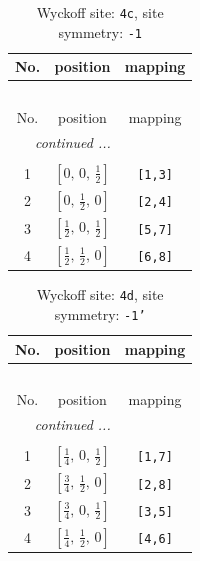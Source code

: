 \documentclass[fleqn,8pt]{jsarticle}
\begin{document}
\renewcommand{\arraystretch}{1.2}
\begin{longtable}{ccc}
\caption{Wyckoff site: {\tt 4c}, site symmetry: {\tt -1}}
 \\
 \hline \hline
No. & position & mapping \\ \hline \endfirsthead

\multicolumn{2}{l}{\tablename\ \thetable{}} \\
 \hline \hline
No. & position & mapping \\ \hline \endhead

 \hline \hline
\multicolumn{2}{r}{\footnotesize\it continued ...} \\ \endfoot

 \hline \hline
\multicolumn{2}{r}{} \\ \endlastfoot

1 & $\left[ 0,\, 0,\, \frac{1}{2} \right]$ & {\tt [1,3]} \\ \hline
2 & $\left[ 0,\, \frac{1}{2},\, 0 \right]$ & {\tt [2,4]} \\ \hline
3 & $\left[ \frac{1}{2},\, 0,\, \frac{1}{2} \right]$ & {\tt [5,7]} \\ \hline
4 & $\left[ \frac{1}{2},\, \frac{1}{2},\, 0 \right]$ & {\tt [6,8]} \\
\end{longtable}
\renewcommand{\arraystretch}{1.2}
\begin{longtable}{ccc}
\caption{Wyckoff site: {\tt 4d}, site symmetry: {\tt -1'}}
 \\
 \hline \hline
No. & position & mapping \\ \hline \endfirsthead

\multicolumn{2}{l}{\tablename\ \thetable{}} \\
 \hline \hline
No. & position & mapping \\ \hline \endhead

 \hline \hline
\multicolumn{2}{r}{\footnotesize\it continued ...} \\ \endfoot

 \hline \hline
\multicolumn{2}{r}{} \\ \endlastfoot

1 & $\left[ \frac{1}{4},\, 0,\, \frac{1}{2} \right]$ & {\tt [1,7]} \\ \hline
2 & $\left[ \frac{3}{4},\, \frac{1}{2},\, 0 \right]$ & {\tt [2,8]} \\ \hline
3 & $\left[ \frac{3}{4},\, 0,\, \frac{1}{2} \right]$ & {\tt [3,5]} \\ \hline
4 & $\left[ \frac{1}{4},\, \frac{1}{2},\, 0 \right]$ & {\tt [4,6]} \\
\end{longtable}
\end{document}
